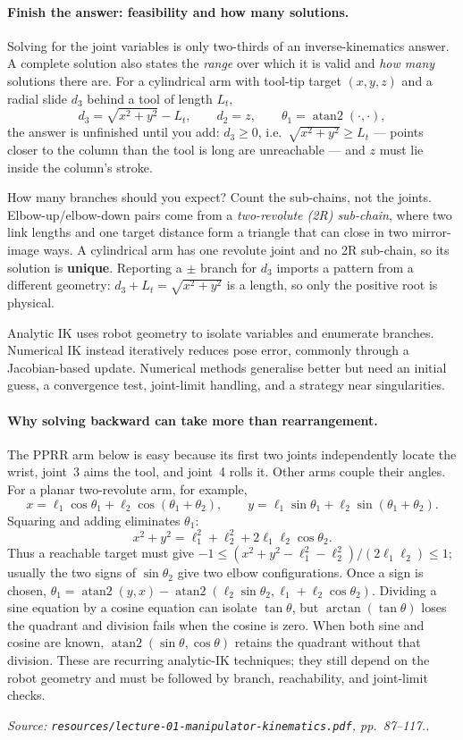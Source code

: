 \documentclass[11pt,a4paper]{article}
\renewcommand{\texttt}[1]{\nolinkurl{#1}}
\newcommand{\source}[1]{\par\smallskip\noindent\textit{Source: #1.}\par\smallskip}
\begin{document}
\paragraph{Finish the answer: feasibility and how many solutions.}
Solving for the joint variables is only two-thirds of an inverse-kinematics answer. A complete
solution also states the \emph{range} over which it is valid and \emph{how many} solutions there
are. For a cylindrical arm with tool-tip target $(x,y,z)$ and a radial slide $d_3$ behind a tool of
length $L_t$,
\[
 d_3=\sqrt{x^2+y^2}-L_t,\qquad d_2=z,\qquad \theta_1=\operatorname{atan2}(\cdot,\cdot),
\]
the answer is unfinished until you add: $d_3\ge 0$, i.e.\ $\sqrt{x^2+y^2}\ge L_t$ --- points closer
to the column than the tool is long are unreachable --- and $z$ must lie inside the column's stroke.

How many branches should you expect? Count the sub-chains, not the joints. Elbow-up/elbow-down pairs
come from a \emph{two-revolute (2R) sub-chain}, where two link lengths and one target distance form a
triangle that can close in two mirror-image ways. A cylindrical arm has one revolute joint and no 2R
sub-chain, so its solution is \textbf{unique}. Reporting a $\pm$ branch for $d_3$ imports a pattern
from a different geometry: $d_3+L_t=\sqrt{x^2+y^2}$ is a length, so only the positive root is
physical.

Analytic IK uses robot geometry to isolate variables and enumerate branches. Numerical IK instead iteratively reduces pose error, commonly through a Jacobian-based update. Numerical methods generalise better but need an initial guess, a convergence test, joint-limit handling, and a strategy near singularities.

\paragraph{Why solving backward can take more than rearrangement.}
The PPRR arm below is easy because its first two joints independently locate the wrist,
joint~3 aims the tool, and joint~4 rolls it. Other arms couple their angles. For a planar
two-revolute arm, for example,
\[
 x=\ell_1\cos\theta_1+\ell_2\cos(\theta_1+\theta_2),\qquad
 y=\ell_1\sin\theta_1+\ell_2\sin(\theta_1+\theta_2).
\]
Squaring and adding eliminates $\theta_1$:
\[
 x^2+y^2=\ell_1^2+\ell_2^2+2\ell_1\ell_2\cos\theta_2.
\]
Thus a reachable target must give $-1\leq (x^2+y^2-\ell_1^2-\ell_2^2)/(2\ell_1\ell_2)\leq1$;
usually the two signs of $\sin\theta_2$ give two elbow configurations. Once a sign is
chosen, $\theta_1=\operatorname{atan2}(y,x)-
\operatorname{atan2}(\ell_2\sin\theta_2,\ell_1+\ell_2\cos\theta_2)$.
Dividing a sine equation by a cosine equation can isolate $\tan\theta$,
but $\arctan(\tan\theta)$ loses the quadrant and division fails when the cosine is zero.
When both sine and cosine are known, $\operatorname{atan2}(\sin\theta,\cos\theta)$
retains the quadrant without that division. These are recurring analytic-IK techniques;
they still depend on the robot geometry and must be followed by branch, reachability,
and joint-limit checks.
\source{\texttt{resources/lecture-01-manipulator-kinematics.pdf}, pp.~87--117.}
\end{document}
